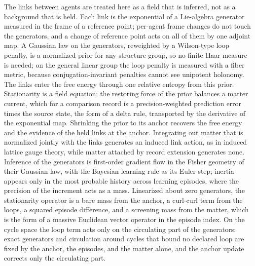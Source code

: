The links between agents are treated here as a field that is inferred, not as a background that is held.
Each link is the exponential of a Lie-algebra generator measured in the frame of a reference point;
per-agent frame changes do not touch the generators, and a change of reference point acts on all of them
by one adjoint map. A Gaussian law on the generators, reweighted by a Wilson-type loop penalty, is a
normalized prior for any structure group, so no finite Haar measure is needed; on the general linear
group the loop penalty is measured with a fiber metric, because conjugation-invariant penalties cannot
see unipotent holonomy. The links enter the free energy through one relative entropy from this prior.
Stationarity is a field equation: the restoring force of the prior balances a matter current, which for
a comparison record is a precision-weighted prediction error times the source state, the form of a delta
rule, transported by the derivative of the exponential map. Shrinking the prior to its anchor recovers
the free energy and the evidence of the held links at the anchor. Integrating out matter that is normalized jointly with the links generates an induced
link action, as in induced lattice gauge theory, while matter attached by record extension generates
none. Inference of the generators is first-order gradient flow in the Fisher geometry of their Gaussian
law, with the Bayesian learning rule as its Euler step; inertia appears only in the most probable
history across learning episodes, where the precision of the increment acts as a mass. Linearized about
zero generators, the stationarity operator is a bare mass from the anchor, a curl-curl term from the
loops, a squared episode difference, and a screening mass from the matter, which is the form of a
massive Euclidean vector operator in the episode index. On the cycle space the loop term acts only on the circulating part of the
generators: exact generators and circulation around cycles that bound no declared loop are fixed by the
anchor, the episodes, and the matter alone, and the anchor update corrects only the circulating part.

